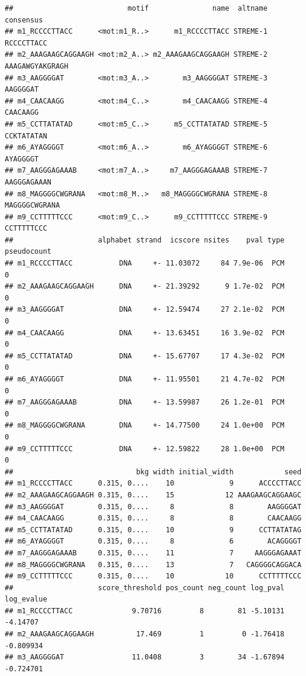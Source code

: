 \documentclass[
]{book}
\begin{document}
\begin{verbatim}
##                           motif               name  altname       consensus
## m1_RCCCCTTACC      <mot:m1_R..>      m1_RCCCCTTACC STREME-1      RCCCCTTACC
## m2_AAAGAAGCAGGAAGH <mot:m2_A..> m2_AAAGAAGCAGGAAGH STREME-2 AAAGAWGYAKGRAGH
## m3_AAGGGGAT        <mot:m3_A..>        m3_AAGGGGAT STREME-3        AAGGGGAT
## m4_CAACAAGG        <mot:m4_C..>        m4_CAACAAGG STREME-4        CAACAAGG
## m5_CCTTATATAD      <mot:m5_C..>      m5_CCTTATATAD STREME-5      CCKTATATAN
## m6_AYAGGGGT        <mot:m6_A..>        m6_AYAGGGGT STREME-6        AYAGGGGT
## m7_AAGGGAGAAAB     <mot:m7_A..>     m7_AAGGGAGAAAB STREME-7     AAGGGAGAAAN
## m8_MAGGGGCWGRANA   <mot:m8_M..>   m8_MAGGGGCWGRANA STREME-8   MAGGGGCWGRANA
## m9_CCTTTTTCCC      <mot:m9_C..>      m9_CCTTTTTCCC STREME-9      CCTTTTTCCC
##                    alphabet strand  icscore nsites    pval type pseudocount
## m1_RCCCCTTACC           DNA     +- 11.03072     84 7.9e-06  PCM           0
## m2_AAAGAAGCAGGAAGH      DNA     +- 21.39292      9 1.7e-02  PCM           0
## m3_AAGGGGAT             DNA     +- 12.59474     27 2.1e-02  PCM           0
## m4_CAACAAGG             DNA     +- 13.63451     16 3.9e-02  PCM           0
## m5_CCTTATATAD           DNA     +- 15.67707     17 4.3e-02  PCM           0
## m6_AYAGGGGT             DNA     +- 11.95501     21 4.7e-02  PCM           0
## m7_AAGGGAGAAAB          DNA     +- 13.59987     26 1.2e-01  PCM           0
## m8_MAGGGGCWGRANA        DNA     +- 14.77500     24 1.0e+00  PCM           0
## m9_CCTTTTTCCC           DNA     +- 12.59822     28 1.0e+00  PCM           0
##                             bkg width initial_width            seed
## m1_RCCCCTTACC      0.315, 0....    10             9      ACCCCTTACC
## m2_AAAGAAGCAGGAAGH 0.315, 0....    15            12 AAAGAAGCAGGAAGC
## m3_AAGGGGAT        0.315, 0....     8             8        AAGGGGAT
## m4_CAACAAGG        0.315, 0....     8             8        CAACAAGG
## m5_CCTTATATAD      0.315, 0....    10             9      CCTTATATAG
## m6_AYAGGGGT        0.315, 0....     8             6        ACAGGGGT
## m7_AAGGGAGAAAB     0.315, 0....    11             7     AAGGGAGAAAT
## m8_MAGGGGCWGRANA   0.315, 0....    13             7   CAGGGGCAGGACA
## m9_CCTTTTTCCC      0.315, 0....    10            10      CCTTTTTCCC
##                    score_threshold pos_count neg_count log_pval log_evalue
## m1_RCCCCTTACC              9.70716         8        81 -5.10131   -4.14707
## m2_AAAGAAGCAGGAAGH          17.469         1         0 -1.76418  -0.809934
## m3_AAGGGGAT                11.0408         3        34 -1.67894  -0.724701

\end{verbatim}
\end{document}
